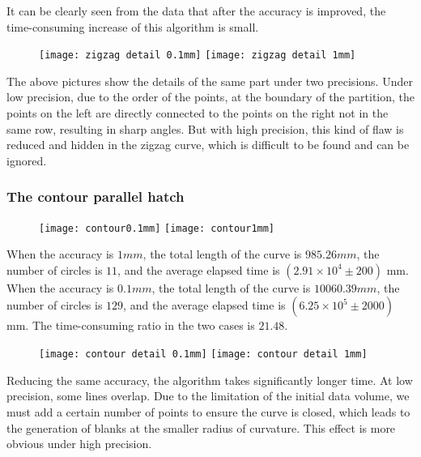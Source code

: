 \documentclass{apmcmthesis}
\begin{document}
It can be clearly seen from the data that after the accuracy is improved, the time-consuming increase of this algorithm is small.

\begin{figure}[!ht]
    \centering
    \texttt{[image: zigzag detail 0.1mm]} \quad \texttt{[image: zigzag detail 1mm]}
    \caption{}
    \caption{}
\end{figure}

The above pictures show the details of the same part under two precisions. Under low precision, due to the order of the points, at the boundary of the partition, the points on the left are directly connected to the points on the right not in the same row, resulting in sharp angles. But with high precision, this kind of flaw is reduced and hidden in the zigzag curve, which is difficult to be found and can be ignored.

\subsubsection{The contour parallel hatch}


\begin{figure}[!ht]
    \centering
    \texttt{[image: contour0.1mm]} \quad \texttt{[image: contour1mm]}
    \caption{}
    \caption{}
\end{figure}

When the accuracy is $1mm$, the total length of the curve is $985.26mm$, the number of circles is $11$, and the average elapsed time is $(2.91\times 10^4\pm 200)$ mm. When the accuracy is $0.1mm$, the total length of the curve is $10060.39mm$, the number of circles is $129$, and the average elapsed time is $(6.25\times 10^5\pm 2000)$ mm. The time-consuming ratio in the two cases is $21.48$.


\begin{figure}[!ht]
    \centering
    \texttt{[image: contour detail 0.1mm]} \quad \texttt{[image: contour detail 1mm]}
    \caption{}
    \caption{}
\end{figure}

Reducing the same accuracy, the algorithm takes significantly longer time. At low precision, some lines overlap. Due to the limitation of the initial data volume, we must add a certain number of points to ensure the curve is closed, which leads to the generation of blanks at the smaller radius of curvature. This effect is more obvious under high precision.
\end{document}
